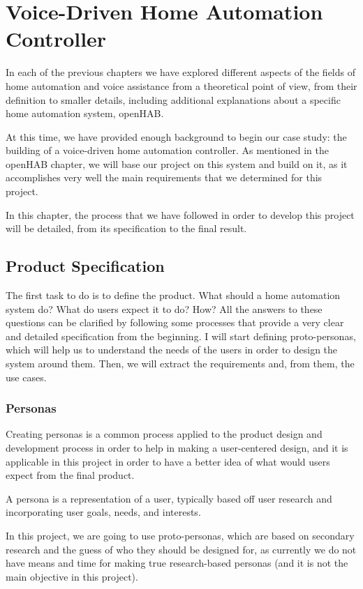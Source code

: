 \chapter{Voice-Driven Home Automation Controller}

In each of the previous chapters we have explored different aspects of the fields of home automation and voice assistance from a
theoretical point of view, from their definition to smaller details, including additional explanations about a specific home automation
system, openHAB.

At this time, we have provided enough background to begin our case study: the building of a voice-driven home automation controller. 
As mentioned in the openHAB chapter, we will base our project on this system and build on it, as it accomplishes very well the main
requirements that we determined for this project.

In this chapter, the process that we have followed in order to develop this project will be detailed, from its specification to
the final result.

\section{Product Specification}
The first task to do is to define the product. What should a home automation system do? What do users expect it to do? How? All
the answers to these questions can be clarified by following some processes that provide a very clear and detailed specification 
from the beginning. I will start defining proto-personas, which will help us to understand the needs of the users in order to design 
the system around them. Then, we will extract the requirements and, from them, the use cases.

\subsection{Personas}
Creating personas is a common process applied to the product design and development process in order to help in making a user-centered
design, and it is applicable in this project in order to have a better idea of what would users expect from the final product.

A persona is a representation of a user, typically based off user research and incorporating user goals, needs, and interests.

In this project, we are going to use proto-personas, which are based on secondary research and the guess of who they should be designed
for, as currently we do not have means and time for making true research-based personas (and it is not the main objective in this project).

